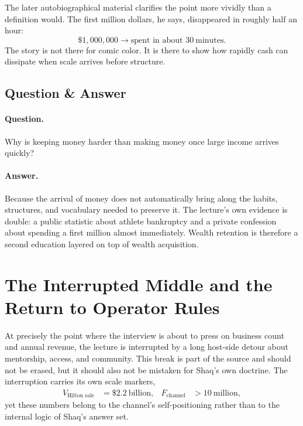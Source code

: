 The later autobiographical material clarifies the point more vividly than a definition would. The first million dollars, he says, disappeared in roughly half an hour:
\begin{equation}
\text{\$}1{,}000{,}000 \to \text{spent in about }30\ \text{minutes}.
\end{equation}
The story is not there for comic color. It is there to show how rapidly cash can dissipate when scale arrives before structure.

\subsection{Question \& Answer}

\paragraph{Question.} Why is keeping money harder than making money once large income arrives quickly?

\paragraph{Answer.} Because the arrival of money does not automatically bring along the habits, structures, and vocabulary needed to preserve it. The lecture's own evidence is double: a public statistic about athlete bankruptcy and a private confession about spending a first million almost immediately. Wealth retention is therefore a second education layered on top of wealth acquisition.

\section{The Interrupted Middle and the Return to Operator Rules}

At precisely the point where the interview is about to press on business count and annual revenue, the lecture is interrupted by a long host-side detour about mentorship, access, and community. This break is part of the source and should not be erased, but it should also not be mistaken for Shaq's own doctrine. The interruption carries its own scale markers,
\begin{align}
V_{\text{Hilton sale}} &= \text{\$}2.2\ \text{billion}, &
F_{\text{channel}} &> 10\ \text{million},
\end{align}
yet these numbers belong to the channel's self-positioning rather than to the internal logic of Shaq's answer set.

